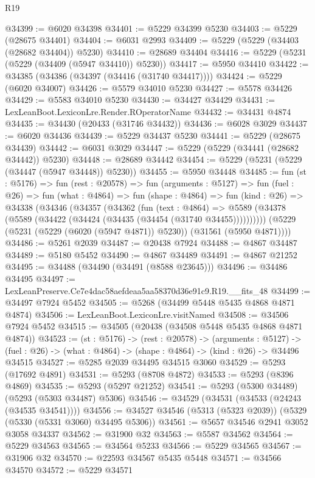 \begin{lexlean}{R19}
\begin{coremodule}
@34399 := @6020 @34398
@34401 := @5229 @34399 @5230
@34403 := @5229 (@28675 @34401)
@34404 := @6031 @2993
@34409 := @5229 (@5229 (@34403 (@28682 @34404)) @5230)
@34410 := @28689 @34404
@34416 := @5229 (@5231 (@5229 (@34409 (@5947 @34410)) @5230))
@34417 := @5950 @34410
@34422 := @34385 (@34386 (@34397 (@34416 (@31740 @34417))))
@34424 := @5229 (@6020 @34007)
@34426 := @5579 @34010 @5230
@34427 := @5578 @34426
@34429 := @5583 @34010 @5230
@34430 := @34427 @34429
@34431 := LexLeanBoot.LexiconLre.Render.ROperatorName
@34432 := @34431 @4874
@34435 := @34430 (@20433 (@31746 @34432))
@34436 := @6028 @3029
@34437 := @6020 @34436
@34439 := @5229 @34437 @5230
@34441 := @5229 (@28675 @34439)
@34442 := @6031 @3029
@34447 := @5229 (@5229 (@34441 (@28682 @34442)) @5230)
@34448 := @28689 @34442
@34454 := @5229 (@5231 (@5229 (@34447 (@5947 @34448)) @5230))
@34455 := @5950 @34448
@34485 := fun (st : @5176) =>
  fun (rest : @20578) =>
  fun (arguments : @5127) =>
  fun (fuel : @26) =>
  fun (what : @4864) =>
  fun (shape : @4864) =>
  fun (kind : @26) =>
  @34338
    (@34346
      (@34357
        (@34362
          (fun (text : @4864) =>
          @5589 (@34378 (@5589 (@34422 (@34424 (@34435 (@34454 (@31740 @34455))))))))))
      (@5229 (@5231 (@5229 (@6020 (@5947 @4871)) @5230)) (@31561 (@5950 @4871))))
@34486 := @5261 @2039
@34487 := @20438 @7924
@34488 := @4867 @34487
@34489 := @5180 @5452
@34490 := @4867 @34489
@34491 := @4867 @21252
@34495 := @34488 (@34490 (@34491 (@8588 @23645)))
@34496 := @34486 @34495
@34497 := LexLeanPreserve.Ce7e4dac58aefdeaa5aa58370d36e91c9.R19.__fits_48
@34499 := @34497 @7924 @5452
@34505 := @5268 (@34499 @5448 @5435 @4868 @4871 @4874)
@34506 := LexLeanBoot.LexiconLre.visitNamed
@34508 := @34506 @7924 @5452
@34515 := @34505 (@20438 (@34508 @5448 @5435 @4868 @4871 @4874))
@34523 := (st : @5176) ->
  (rest : @20578) ->
  (arguments : @5127) ->
  (fuel : @26) -> (what : @4864) -> (shape : @4864) -> (kind : @26) -> @34496 @34515
@34527 := @5285 @2039 @34495 @34515 @3060
@34529 := @5293 (@17692 @4891)
@34531 := @5293 (@8708 @4872)
@34533 := @5293 (@8396 @4869)
@34535 := @5293 (@5297 @21252)
@34541 := @5293 (@5300 @34489) (@5293 (@5303 @34487) @5306)
@34546 := @34529 (@34531 (@34533 (@24243 (@34535 @34541))))
@34556 := @34527 @34546 (@5313 (@5323 @2039)) (@5329 (@5330 (@5331 @3060) @34495 @5306))
@34561 := @5657 @34546 @2941 @3052 @3058 @34337
@34562 := @31900 @32
@34563 := @5587 @34562
@34564 := @5229 @34563
@34565 := @34564 @5233
@34566 := @5229 @34565
@34567 := @31906 @32
@34570 := @22593 @34567 @5435 @5448
@34571 := @34566 @34570
@34572 := @5229 @34571

\end{coremodule}
\end{lexlean}
